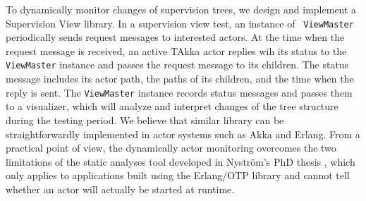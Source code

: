 To dynamically monitor changes of supervision trees, we design and implement 
a Supervision View library. In a supervision view test, an instance of {\tt 
ViewMaster} periodically sends request messages to interested actors.  At the 
time when the request message is received, an active TAkka actor replies wih 
its status to the {\tt ViewMaster} instance and passes the request message to 
its children.  The status message includes its actor path, the paths of its 
children, and the time when the reply is sent.  The {\tt ViewMaster} instance 
records status messages and passes them to a visualizer, which will analyze and 
interpret changes of the tree structure during the testing period.  We believe 
that similar library can be straightforwardly implemented in actor systems such 
as Akka and Erlang.  From a practical point of view, the dynamically actor 
monitoring overcomes the two limitations of the static analyses tool 
developed in Nyström's PhD thesis \cite{JanHenry}, which only applies to 
applications built using the Erlang/OTP library and cannot tell whether 
an actor will actually be started at runtime.


